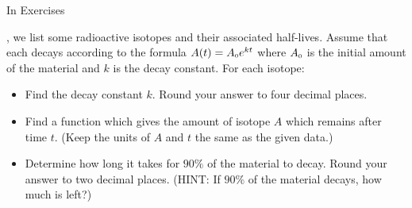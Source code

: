 {\noindent In Exercises}
{,  we list some radioactive isotopes and their associated half-lives.  Assume that each decays according to the formula $A(t) = A_{\text{\tiny $0$}}e^{kt}$ where $A_{\text{\tiny $0$}}$ is the initial amount of the material and $k$ is the decay constant. For each isotope:

\begin{itemize}

\item  Find the decay constant $k$.  Round your answer to four decimal places.

\item  Find a function which gives the amount of isotope $A$ which remains after time $t$.  (Keep the units of $A$ and $t$ the same as the given data.)

\item  Determine how long it takes for $90 \%$ of the material to decay.  Round your answer to two decimal places.  (HINT:  If $90 \%$ of the material decays, how much is left?)

\end{itemize}}
